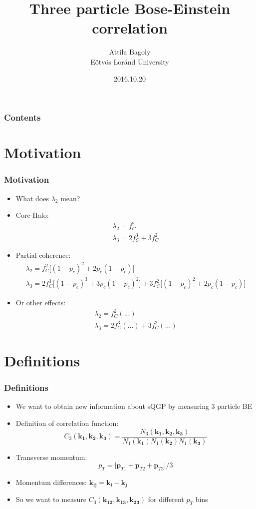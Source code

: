 \documentclass{beamer}
\title[HBT]{Three particle Bose-Einstein correlation}
\author[Attila Bagoly]{Attila Bagoly\\ Eötvös Loránd University \vspace{0.5cm}}
\date[2016.10.20.]{2016.10.20}
\institute[ELTE]{
\large{Supervisor: Máté Csanád}
}
\begin{document}
\begin{frame}
  \titlepage
\end{frame}

\begin{frame}
\frametitle{Contents}
\tableofcontents
\end{frame}


\section{Motivation}
\begin{frame}
\frametitle{Motivation}
\begin{itemize}
\setlength{\itemsep}{12pt}
\item What does $\lambda_2$ mean?
\item Core-Halo: 
	\begin{align}
		\lambda_2=f_C^2\nonumber\\
		\lambda_3 = 2f_C^3+3f_C^2
	\end{align}
\item Partial coherence: 
	\begin{align}
		\lambda_2=f_C^2\big[(1-p_c)^2+2p_c(1-p_c)\big]\nonumber\\
		\lambda_3=2f_C^3\big[(1-p_c)^3+3p_c(1-p_c)^2\big]+3f_C^2\big[(1-p_c)^2+2p_c(1-p_c)\big]
	\end{align}
\item Or other effects: 
	\begin{align}
		\lambda_2 = f_C^2(...)\nonumber\\
		\lambda_3 = 2f_C^3(...)+3f_C^2(...)
	\end{align}
\end{itemize}
\end{frame}

\section{Definitions}
\begin{frame}
\frametitle{Definitions}
\begin{itemize}
\setlength{\itemsep}{12pt}
\item We want to obtain new information about sQGP by measuring 3 particle BE
\item Definition of correlation function:
\begin{equation}
C_3(\bm{k_1}, \bm{k_2}, \bm{k_3})=\frac{N_3(\bm{k_1}, \bm{k_2}, \bm{k_3})}{N_1(\bm{k_1})N_1(\bm{k_2})N_1(\bm{k_3})} \label{eq:e1}
\end{equation}
\item Transverse momentum:
\begin{equation}
p_T=\big|\bm{p}_{T1}+\bm{p}_{T2}+\bm{p}_{T3}\big|/3
\end{equation}
\item Momentum differences: $\bm{k_{ij}}=\bm{k_i}-\bm{k_j}$
\item So we want to measure $C_3(\bm{k_{12}}, \bm{k_{13}}, \bm{k_{23}})$ for different $p_T$ bins
\end{itemize}
\end{frame}
\end{document}
